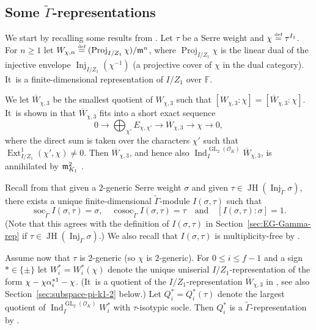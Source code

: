 \documentclass[JEP,XML,SOM,Unicode,NoFloatCountersInSection, NoEqCountersInSection,published]{cedram}
\newcommand{\quand}{\quad\text{and}\quad}
\let\wt\widetilde
\let\ovl\overline
\newcommand{\defeq}{\stackrel{\textrm{\tiny{\upshape{def}}}}{=}}
\newcommand{\F}{\mathbb{F}}
\newcommand{\cO}{\mathcal{O}}
\DeclareMathOperator{\cosoc}{cosoc}
\DeclareMathOperator{\Ext}{Ext}
\DeclareMathOperator{\GL}{GL}
\DeclareMathOperator{\Ind}{Ind}
\DeclareMathOperator{\Inj}{Inj}
\DeclareMathOperator{\JH}{\mathrm{JH}}
\DeclareMathOperator{\Proj}{Proj}
\DeclareMathOperator{\soc}{soc}
\theoremstyle{plain}
\theoremstyle{definition}
\begin{document}
\subsection{Some \texorpdfstring{$\wt\Gamma$}{\textbackslash tilde Gamma}-representations}
\label{sec:some-wtgamma-repr}

We start by recalling some results from \cite{HuWang2}.
Let $\tau$ be a Serre weight and $\chi\defeq \tau^{I_1}$.
For $n \ge 1$ let $W_{\chi,n}\defeq (\Proj_{I/Z_1}\chi)/\m^n$, {where $\Proj_{I/Z_1}\chi$ is the linear dual of the injective envelope $\Inj_{I/Z_1}(\chi^{-1})$ (a projective cover of $\chi$ in the dual category). It~is} a finite-dimensional representation of $I/Z_1$ over $\F$.

We let $\overline{W}_{\chi,3}$ be the smallest quotient of $W_{\chi,3}$ such that $[W_{\chi,3}:\chi]=[\overline{W}_{\chi,3}:\chi]$. It~is shown in \cite[Lem.\,3.2]{HuWang2} that $\overline{W}_{\chi,3}$ fits into a short exact sequence
\begin{equation}
\label{eq:Wbar3}
0\to \bigoplus_{\chi'} E_{\chi,\chi'}\to \overline{W}_{\chi,3}\to \chi\to 0,
\end{equation}
where the direct sum is taken over the characters $\chi'$ such that $\Ext^1_{I/Z_1}(\chi',\chi)\neq 0$.
Then $\overline{W}_{\chi,3}$, and hence also $\Ind_I^{\GL_2(\cO_K)}\overline{W}_{\chi,3}$, is annihilated by $\mathfrak{m}_{K_1}^2$ \cite[Cor.\,3.3]{HuWang2}.

Recall from \cite[Th.\,2.23]{HuWang2} that given a $2$-generic Serre weight $\sigma$ and given $\tau\in \JH(\Inj_{\wt{\Gamma}}\sigma)$, there exists a unique finite-dimensional $\wt{\Gamma}$-module $I(\sigma,\tau)$ such that
\[
\soc_{\wt{\Gamma}}I(\sigma,\tau)=\sigma,\quad \cosoc_{\wt{\Gamma}}I(\sigma,\tau)=\tau\quand [I(\sigma,\tau):\sigma]=1.
\]
(Note that this agrees with the definition of $I(\sigma,\tau)$ in Section~\ref{sec:EG-Gamma-rep} if $\tau \in \JH(\Inj_\Gamma\sigma)$.)
We also recall that $I(\sigma,\tau)$ is multiplicity-free by \cite[Cor.\,2.25]{HuWang2}.

Assume now that $\tau$ is $2$-generic (so $\chi$ is $2$-generic).
For $0 \le i \le f-1$ and a sign $* \in \{\pm\}$ let $W_i^* = W_i^*(\chi)$ denote the unique uniserial $I/Z_1$-representation of the form $\chi \-- \chi \alpha_i^{*1} \-- \chi$.
(It~is a quotient of the $I/Z_1$-representation $\ovl W_{\chi,3}$ in \cite[\S 3.1]{HuWang2}, see also Section~\ref{sec:subspace-pi-k1-2} below.)
Let $Q_i^* = Q_i^*(\tau)$ denote the largest quotient of $\Ind_I^{\GL_2(\cO_K)} W_i^*$ with $\tau$-isotypic socle.
Then $Q_i^*$ is a $\wt\Gamma$-representation by \cite[Cor.\,3.3]{HuWang2}.
\end{document}
